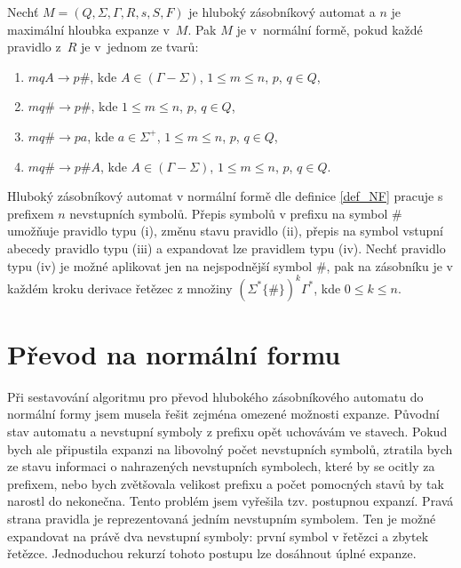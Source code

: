 \begin{Def}\label{def_NF}
Nechť $M = (Q,\Sigma,\Gamma, R, s, S , F)$ je hluboký zásobníkový automat
a $n$ je maximální hloubka expanze v~$M$.
Pak $M$ je v~normální formě, pokud každé pravidlo z~$R$ je v~jednom ze tvarů:

\begin{enumerate}
\renewcommand{\labelenumi}{(\roman{enumi})}

\item $mqA \rightarrow p\#$, kde $A \in (\Gamma - \Sigma)$, $1 \le m \le n$, $p$, $q \in Q$,
\item $mq\# \rightarrow p\#$, kde $1 \le m \le n$, $p$, $q \in Q$,
\item $mq\# \rightarrow pa$, kde $a \in {\Sigma}^+$, $1 \le m \le n$, $p$, $q \in Q$,
\item $mq\# \rightarrow p\#A$, kde $A \in (\Gamma - \Sigma)$, $1 \le m \le n$, $p$, $q \in Q$.

\end{enumerate}

\end{Def}
\medskip
Hluboký zásobníkový automat v normální formě dle definice \ref{def_NF} pracuje s prefixem $n$ nevstupních symbolů. Přepis symbolů v prefixu na symbol $\#$ umožňuje pravidlo typu (i), změnu stavu pravidlo (ii), přepis na symbol vstupní abecedy pravidlo typu (iii) a expandovat lze pravidlem typu (iv). Nechť pravidlo typu (iv) je možné aplikovat jen na nejspodnější symbol $\#$, pak na zásobníku je v každém kroku derivace řetězec z množiny $ ( \Sigma^* \{ \# \} )^k  \Gamma^*$, kde $0 \le k \le n$. 

\section{Převod na normální formu}

Při sestavování algoritmu pro převod hlubokého zásobníkového automatu do normální formy jsem musela řešit zejména omezené možnosti expanze. Původní stav automatu a nevstupní symboly z prefixu opět uchovávám ve stavech. Pokud bych ale připustila expanzi na libovolný počet nevstupních symbolů, ztratila bych ze stavu informaci o nahrazených nevstupních symbolech, které by se ocitly za prefixem, nebo bych zvětšovala velikost prefixu a počet pomocných stavů by tak narostl do nekonečna. Tento problém jsem vyřešila tzv. postupnou expanzí. Pravá strana pravidla je reprezentovaná jedním nevstupním symbolem. Ten je možné expandovat na právě dva nevstupní symboly: první symbol v řetězci a zbytek řetězce. Jednoduchou rekurzí tohoto postupu lze dosáhnout úplné expanze.

